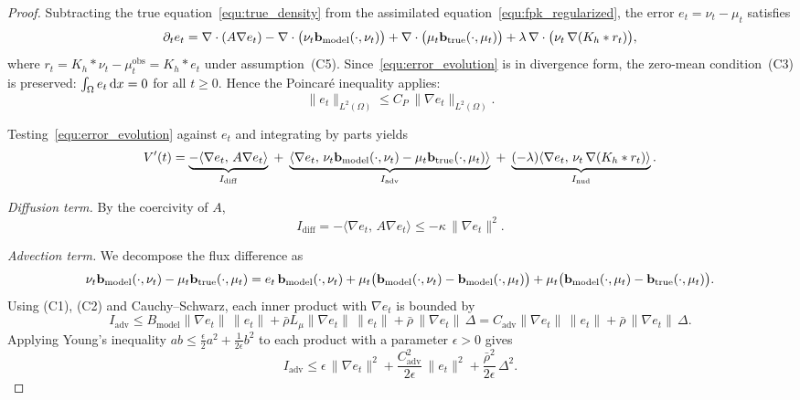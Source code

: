 \begin{proof}
Subtracting the true equation~\eqref{equ:true_density} from the assimilated equation~\eqref{equ:fpk_regularized}, the error $e_t=\nu_t-\mu_t$ satisfies
\begin{equation}\label{equ:error_evolution}
\partial_t e_t
= \nabla\cdot(A\nabla e_t)
- \nabla\cdot\bigl(\nu_t\mathbf{b}_{\mathrm{model}}(\cdot,\nu_t)\bigr)
+ \nabla\cdot\bigl(\mu_t\mathbf{b}_{\mathrm{true}}(\cdot,\mu_t)\bigr)
+ \lambda\,\nabla\cdot\bigl(\nu_t\,\nabla(K_h*r_t)\bigr),
\end{equation}
where $r_t = K_h*\nu_t - \mu_t^{\mathrm{obs}} = K_h*e_t$ under assumption~(C5).
Since~\eqref{equ:error_evolution} is in divergence form, the zero-mean condition~(C3) is preserved:
$\int_\Omega e_t\,\mathrm{d} x = 0$ for all $t\ge 0$.
Hence the Poincar\'e inequality applies:
\begin{equation}\label{eq:poincare_e}
\|e_t\|_{L^2(\Omega)} \le C_P\,\|\nabla e_t\|_{L^2(\Omega)}.
\end{equation}

Testing~\eqref{equ:error_evolution} against $e_t$ and integrating by parts yields
\begin{equation}\label{eq:energy_identity}
V'(t)
= \underbrace{-\langle \nabla e_t,\, A\nabla e_t\rangle}_{I_{\mathrm{diff}}}
\;+\; \underbrace{\langle \nabla e_t,\, \nu_t\mathbf{b}_{\mathrm{model}}(\cdot,\nu_t) - \mu_t\mathbf{b}_{\mathrm{true}}(\cdot,\mu_t)\rangle}_{I_{\mathrm{adv}}}
\;+\; \underbrace{(-\lambda)\langle \nabla e_t,\, \nu_t\,\nabla(K_h*r_t)\rangle}_{I_{\mathrm{nud}}}.
\end{equation}
 
\emph{Diffusion term.}
By the coercivity of $A$,
\[
I_{\mathrm{diff}} = -\langle\nabla e_t,\,A\nabla e_t\rangle
\le -\kappa\,\|\nabla e_t\|^2.
\]
 
\emph{Advection term.}
We decompose the flux difference as
\[
\nu_t\mathbf{b}_{\mathrm{model}}(\cdot,\nu_t) - \mu_t\mathbf{b}_{\mathrm{true}}(\cdot,\mu_t)
= e_t\,\mathbf{b}_{\mathrm{model}}(\cdot,\nu_t)
+ \mu_t\bigl(\mathbf{b}_{\mathrm{model}}(\cdot,\nu_t)-\mathbf{b}_{\mathrm{model}}(\cdot,\mu_t)\bigr)
+ \mu_t\bigl(\mathbf{b}_{\mathrm{model}}(\cdot,\mu_t)-\mathbf{b}_{\mathrm{true}}(\cdot,\mu_t)\bigr).
\]
Using (C1), (C2) and Cauchy--Schwarz, each inner product with $\nabla e_t$ is bounded by
\[
I_{\mathrm{adv}}
\le B_{\mathrm{model}}\|\nabla e_t\|\,\|e_t\|
+ \bar\rho L_\mu\|\nabla e_t\|\,\|e_t\|
+ \bar\rho\,\|\nabla e_t\|\,\Delta
= C_{\mathrm{adv}}\|\nabla e_t\|\,\|e_t\|
+ \bar\rho\,\|\nabla e_t\|\,\Delta.
\]
Applying Young's inequality $ab\le\frac{\epsilon}{2}a^2+\frac{1}{2\epsilon}b^2$ to each product with a parameter $\epsilon>0$ gives
\begin{equation}\label{eq:adv_young}
I_{\mathrm{adv}}
\le \epsilon\,\|\nabla e_t\|^2
+ \frac{C_{\mathrm{adv}}^2}{2\epsilon}\,\|e_t\|^2
+ \frac{\bar\rho^2}{2\epsilon}\,\Delta^2.
\end{equation}
 

\end{proof}
